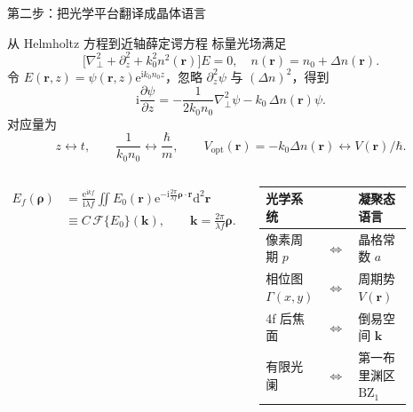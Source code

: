 \documentclass[UTF8,fontset=none,aspectratio=169,10pt]{ctexbeamer}
\newcommand{\ii}{\mathrm{i}}
\newcommand{\dd}{\mathrm{d}}
\newcommand{\ee}{\mathrm{e}}
\newcommand{\FT}{\mathcal{F}}
\newcommand{\kb}{\mathbf{k}}
\newcommand{\rb}{\mathbf{r}}
\newcommand{\BZ}{\mathrm{BZ}_1}
\begin{document}
\begin{frame}{第二步：把光学平台翻译成晶体语言}
\small
\setlength{\abovedisplayskip}{3pt}
\setlength{\belowdisplayskip}{3pt}
\begin{block}{从 Helmholtz 方程到近轴薛定谔方程}
标量光场满足
\[
\big[\nabla_{\perp}^{2}+\partial_z^2+k_0^2 n^2(\rb)\big]E=0,
\quad
n(\rb)=n_0+\Delta n(\rb).
\]
令 $E(\rb,z)=\psi(\rb,z)\ee^{\ii k_0 n_0 z}$，忽略 $\partial_z^2\psi$ 与 $(\Delta n)^2$，得到
\[
\ii\frac{\partial\psi}{\partial z}
=-\frac{1}{2k_0 n_0}\nabla_{\perp}^{2}\psi
-k_0\,\Delta n(\rb)\psi .
\]
对应量为
\[
z\leftrightarrow t,\qquad
\frac{1}{k_0 n_0}\leftrightarrow \frac{\hbar}{m},\qquad
V_{\mathrm{opt}}(\rb)=-k_0\Delta n(\rb)\leftrightarrow V(\rb)/\hbar .
\]
\end{block}

\begin{columns}[T,onlytextwidth]
\[
\begin{aligned}
E_f(\boldsymbol{\rho})
&=\frac{\ee^{\ii kf}}{\ii\lambda f}
\iint E_0(\rb)
\ee^{-\ii\frac{2\pi}{\lambda f}\boldsymbol{\rho}\cdot\rb}\dd^2\rb  \\
&\equiv C\,\FT\!\{E_0\}(\kb),\qquad
\kb=\frac{2\pi}{\lambda f}\boldsymbol{\rho}.
\end{aligned}
\]

\begin{center}
\scriptsize
\setlength{\tabcolsep}{2pt}
\begin{tabular}{>{\raggedright}p{0.37\linewidth}c>{\raggedright\arraybackslash}p{0.38\linewidth}}
\toprule
\textbf{光学系统} & & \textbf{凝聚态语言}\\
\midrule
像素周期 $p$ & $\Longleftrightarrow$ & 晶格常数 $a$\\
相位图 $\Gamma(x,y)$ & $\Longleftrightarrow$ & 周期势 $V(\rb)$\\
4f 后焦面 & $\Longleftrightarrow$ & 倒易空间 $\kb$\\
有限光阑 & $\Longleftrightarrow$ & 第一布里渊区 $\BZ$\\
\bottomrule
\end{tabular}
\end{center}
\end{columns}
\end{frame}
\end{document}
